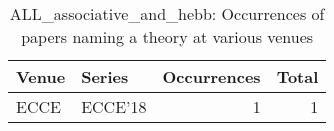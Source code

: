 \begin{table*}[t]
\begin{tabular}{llrr}
Venue & Series & Occurrences & Total\\\hline
\multirow{1}{*}{ECCE} & ECCE'18 & 1 & \multirow{1}{*}{1}\\
\end{tabular}
\caption{ALL\_associative\_and\_hebb: Occurrences of papers naming a theory at various venues}
\end{table*}